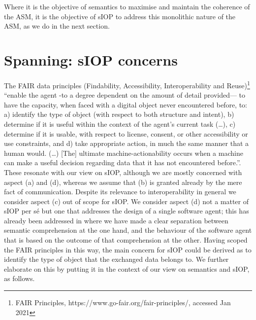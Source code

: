 \documentclass[sort&compress,preprint,authoryear,3p,twocolumn]{elsarticle}
\begin{document}
Where it is the objective of semantics to maximise and maintain the
coherence of the ASM, it is the objective of sIOP to address this
monolithic nature of the ASM, as we do in the next section.

\hypertarget{spanning-siop-concerns}{%
\section{Spanning: sIOP concerns}\label{spanning-siop-concerns}}

The FAIR data principles (Findability, Accessibility, Interoperability
and Reuse)\footnote{FAIR Principles,
  https://www.go-fair.org/fair-principles/, accessed Jan 2021}
\citep{Wilkinson2016} ``enable the agent -to a degree dependent on the
amount of detail provided--- to have the capacity, when faced with a
digital object never encountered before, to: a) identify the type of
object (with respect to both structure and intent), b) determine if it
is useful within the context of the agent's current task (\ldots), c)
determine if it is usable, with respect to license, consent, or other
accessibility or use constraints, and d) take appropriate action, in
much the same manner that a human would. (\ldots) {[}The{]} ultimate
machine-actionability occurs when a machine can make a useful decision
regarding data that it has not encountered before.''. These resonate
with our view on sIOP, although we are mostly concerned with aspect (a)
and (d), whereas we assume that (b) is granted already by the mere fact
of communication. Despite its relevance to interoperability in general
we consider aspect (c) out of scope for sIOP. We consider aspect (d) not
a matter of sIOP per sé but one that addresses the design of a single
software agent; this has already been addressed in \citep[DP
2]{Brandt2021a} where we have made a clear separation between semantic
comprehension at the one hand, and the behaviour of the software agent
that is based on the outcome of that comprehension at the other. Having
scoped the FAIR principles in this way, the main concern for sIOP could
be derived as to identify the type of object that the exchanged data
belongs to. We further elaborate on this by putting it in the context of
our view on semantics and sIOP, as follows.
\end{document}
